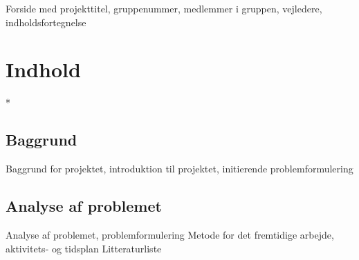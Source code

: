 Forside med projekttitel, gruppenummer, medlemmer i gruppen, vejledere, indholdsfortegnelse
\chapter{Indhold}*
\section{Baggrund}
Baggrund for projektet, introduktion til projektet, initierende problemformulering
\section{Analyse af problemet}
Analyse af problemet, problemformulering
Metode for det fremtidige arbejde, aktivitets- og tidsplan
Litteraturliste
